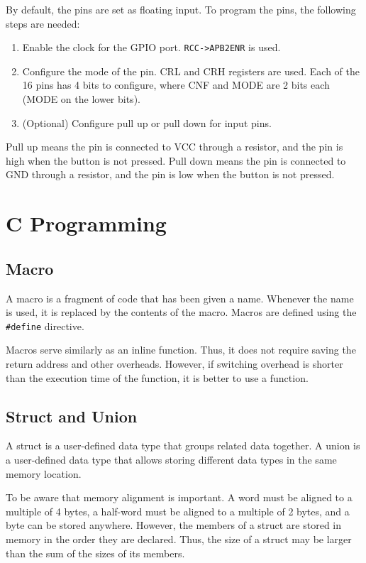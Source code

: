 \documentclass[a4paper,12pt]{article}
\begin{document}
By default, the pins are set as floating input. To program the pins, the following steps are needed:
\begin{enumerate}
	\item Enable the clock for the GPIO port. \texttt{RCC->APB2ENR} is used.
	\item Configure the mode of the pin. CRL and CRH registers are used. Each of the 16 pins has 4 bits to configure, where CNF and MODE are 2 bits each (MODE on the lower bits). 
	\item (Optional) Configure pull up or pull down for input pins. 
\end{enumerate}

Pull up means the pin is connected to VCC through a resistor, and the pin is high when the button is not pressed. Pull down means the pin is connected to GND through a resistor, and the pin is low when the button is not pressed.

\section{C Programming}

\subsection{Macro}

A macro is a fragment of code that has been given a name. Whenever the name is used, it is replaced by the contents of the macro. Macros are defined using the \texttt{\#define} directive.

Macros serve similarly as an inline function. Thus, it does not require saving the return address and other overheads. However, if switching overhead is shorter than the execution time of the function, it is better to use a function.

\subsection{Struct and Union}

A struct is a user-defined data type that groups related data together. A union is a user-defined data type that allows storing different data types in the same memory location.

To be aware that memory alignment is important. A word must be aligned to a multiple of 4 bytes, a half-word must be aligned to a multiple of 2 bytes, and a byte can be stored anywhere. However, the members of a struct are stored in memory in the order they are declared. Thus, the size of a struct may be larger than the sum of the sizes of its members.
\end{document}

